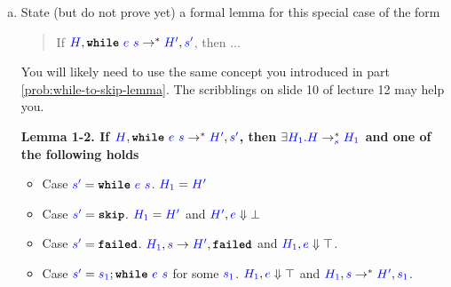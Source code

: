 \documentclass{article}
\theoremstyle{definition}
\newcommand{\meta}[1]{{\color{blue}#1}}
\newcommand{\progtext}[1]{\ensuremath{\text{\ttfamily\bfseries #1}}}
\newcommand{\impskip}{\progtext{skip}}
\newcommand{\failed}{\progtext{failed}}
\newcommand{\while}{\progtext{while}}
\begin{document}
\begin{enumerate}[start=1,label={{\bf Problem \arabic*}.},ref=\arabic*,left=0pt..0pt,widest*=10,align=left,itemindent=*]
\begin{enumerate}[(a),left=1em]
  \item State (but do not prove yet) a formal lemma for this special case of the form
    \begin{quote}
      If $\meta{H}, \while\ \meta{e}\ \meta{s} \to^* \meta{H'},\meta{s'}$, then ...
    \end{quote}
    You will likely need to use the same concept you introduced in part \ref{prob:while-to-skip-lemma}.
    The scribblings on slide 10 of lecture 12 may help you.

    \textbf{Lemma 1-2. If $\meta{H}, \while\ \meta{e}\ \meta{s} \to^* \meta{H'},\meta{s'}$, then $\exists \meta{H_1}. \meta{H}\to_{\meta{s}}^* \meta{H_1}$ and one of the following holds}
    \begin{itemize}
      \item Case $\meta{s^\prime}=\while\ \meta{e}\ \meta{s}$. $\meta{H_1}=\meta{H^\prime}$
      \item Case $\meta{s^\prime}=\impskip$. $\meta{H_1}=\meta{H^\prime}$ and $\meta{H^\prime}, \meta{e}\Downarrow \bot$
      \item Case $\meta{s^\prime}=\failed$. $\meta{H_1}, \meta{s} \to \meta{H^\prime}, \failed$ and $\meta{H_1}, \meta{e} \Downarrow \top$.
      \item Case $\meta{s^\prime}=\meta{s_1}; \while\ \meta{e}\ \meta{s}$ for some $\meta{s_1}$. $\meta{H_1}, \meta{e} \Downarrow \top$ and $\meta{H_1}, \meta{s} \to^* \meta{H^\prime}, \meta{s_1}$.
    \end{itemize}


\end{enumerate}
\end{enumerate}
\end{document}
